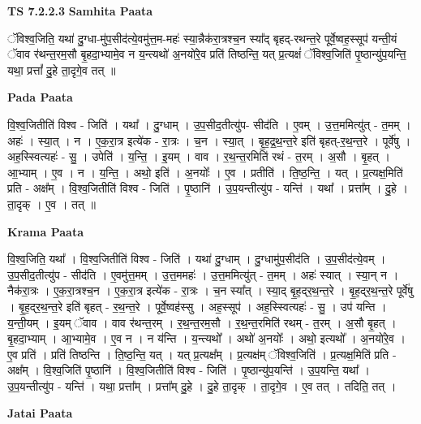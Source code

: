 \documentclass[17pt]{extarticle}
\begin{document}
\textbf{TS 7.2.2.3 } \newline
\textbf{Samhita Paata} \newline

ॅविश्व॒जिति॒ यथा॑ दु॒ग्धा-मु॑प॒सीद॑त्ये॒वमु॑त्त॒म-महः॑ स्या॒न्नैक॑रा॒त्रश्च॒न स्या᳚द् बृहद्-रथन्त॒रे पूर्वे॒ष्वह॒स्सूप॑ यन्ती॒यं ॅवाव र॑थन्त॒रम॒सौ बृ॒हदा॒भ्यामे॒व न य॒न्त्यथो॑ अ॒नयो॑रे॒व प्रति॑ तिष्ठन्ति॒ यत् प्र॒त्यक्षं॑ ॅविश्व॒जिति॑ पृ॒ष्ठान्यु॑प॒यन्ति॒ यथा॒ प्रत्तां᳚ दु॒हे ता॒दृगे॒व तत् ॥ \newline

\textbf{Pada Paata} \newline

वि॒श्व॒जितीति॑ विश्व - जिति॑ । यथा᳚ । दु॒ग्धाम् । उ॒प॒सीद॒तीत्यु॑प- सीद॑ति । ए॒वम् । उ॒त्त॒ममित्यु॑त् - त॒मम् । अहः॑ । स्या॒त् । न । ए॒क॒रा॒त्र इत्ये॑क - रा॒त्रः । च॒न । स्या॒त् । बृ॒ह॒द्र॒थ॒न्त॒रे इति॑ बृहत्-र॒थ॒न्त॒रे । पूर्वे॑षु । अह॒स्स्वित्यहः॑ - सु॒ । उपेति॑ । य॒न्ति॒ । इ॒यम् । वाव । र॒थ॒न्त॒रमिति॑ रथं - त॒रम् । अ॒सौ । बृ॒हत् । आ॒भ्याम् । ए॒व । न । य॒न्ति॒ । अथो॒ इति॑ । अ॒नयोः᳚ । ए॒व । प्रतीति॑ । ति॒ष्ठ॒न्ति॒ । यत् । प्र॒त्यक्ष॒मिति॑ प्रति - अक्ष᳚म् । वि॒श्व॒जितीति॑ विश्व - जिति॑ । पृ॒ष्ठानि॑ । उ॒प॒यन्तीत्यु॑प - यन्ति॑ । यथा᳚ । प्रत्ता᳚म् । दु॒हे । ता॒दृक् । ए॒व । तत् ॥  \newline


\textbf{Krama Paata} \newline

वि॒श्व॒जिति॒ यथा᳚ । वि॒श्व॒जितीति॑ विश्व - जिति॑ । यथा॑ दु॒ग्धाम् । दु॒ग्धामु॑प॒सीद॑ति । उ॒प॒सीद॑त्ये॒वम् । उ॒प॒सीद॒तीत्यु॑प - सीद॑ति । ए॒वमु॑त्त॒मम् । उ॒त्त॒ममहः॑ । उ॒त्त॒ममित्यु॑त् - त॒मम् । अहः॑ स्यात् । स्या॒न् न । नैक॑रा॒त्रः । ए॒क॒रा॒त्रश्च॒न । ए॒क॒रा॒त्र इत्ये॑क - रा॒त्रः । च॒न स्या᳚त् । स्या॒द् बृ॒ह॒द्‍र॒थ॒न्त॒रे । बृ॒ह॒द्‍र॒थ॒न्त॒रे पूर्वे॑षु । बृ॒ह॒द्‍र॒थ॒न्त॒रे इति॑ बृहत् - र॒थ॒न्त॒रे । पूर्वे॒ष्वह॑स्सु । अह॒स्सूप॑ । अह॒स्स्वित्यहः॑ - सु॒ । उप॑ यन्ति । य॒न्ती॒यम् । इ॒यम् ॅवाव । वाव र॑थन्त॒रम् । र॒थ॒न्त॒रम॒सौ । र॒थ॒न्त॒रमिति॑ रथम् - त॒रम् । अ॒सौ बृ॒हत् । बृ॒हदा॒भ्याम् । आ॒भ्यामे॒व । ए॒व न । न य॑न्ति । य॒न्त्यथो᳚ । अथो॑ अ॒नयोः᳚ । अथो॒ इत्यथो᳚ । अ॒नयो॑रे॒व । ए॒व प्रति॑ । प्रति॑ तिष्ठन्ति । ति॒ष्ठ॒न्ति॒ यत् । यत् प्र॒त्यक्ष᳚म् । प्र॒त्यक्ष॑म् ॅविश्व॒जिति॑ । प्र॒त्यक्ष॒मिति॑ प्रति - अक्ष᳚म् । वि॒श्व॒जिति॑ पृ॒ष्ठानि॑ । वि॒श्व॒जितीति॑ विश्व - जिति॑ । पृ॒ष्ठान्यु॑प॒यन्ति॑ । उ॒प॒यन्ति॒ यथा᳚ । उ॒प॒यन्तीत्यु॑प - यन्ति॑ । यथा॒ प्रत्ता᳚म् । प्रत्ता᳚म् दु॒हे । दु॒हे ता॒दृक् । ता॒दृगे॒व । ए॒व तत् । तदिति॒ तत् । \newline

\textbf{Jatai Paata} \newline
\end{document}
